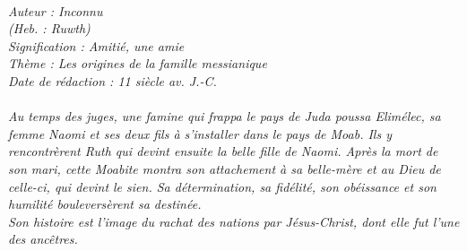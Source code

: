 \BFont
\noindent\hrulefill
{\footnotesize
\textit{
\bigskip
{\centering{}
\\Auteur : Inconnu
\\(Heb. : Ruwth)
\\Signification : Amitié, une amie
\\Thème : Les origines de la famille messianique
\\Date de rédaction : 11 siècle av. J.-C.\\}
}
\textit{
\\Au temps des juges, une famine qui frappa le pays de Juda poussa Elimélec, sa femme Naomi et ses deux fils à s'installer dans le pays de Moab. Ils y rencontrèrent Ruth qui devint ensuite la belle fille de Naomi. Après la mort de son mari, cette Moabite montra son attachement à sa belle-mère et au Dieu de celle-ci, qui devint le sien. Sa détermination, sa fidélité, son obéissance et son humilité bouleversèrent sa destinée.
\\Son histoire est l'image du rachat des nations par Jésus-Christ, dont elle fut l'une des ancêtres.\bigskip
}
}
\par\nobreak\noindent\hrulefill
